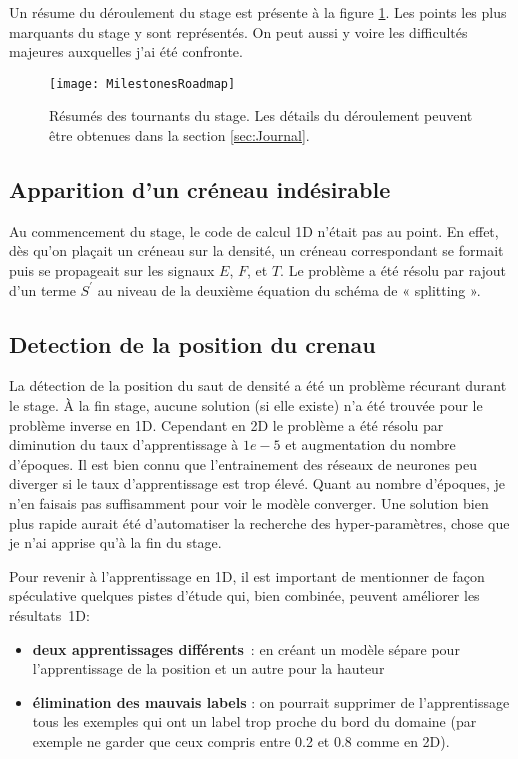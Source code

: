 Un résume du déroulement du stage est présente à la figure \ref{fig:MilestonesRoadmap}. Les points les plus marquants du stage y sont représentés. On peut aussi y voire les difficultés majeures auxquelles j'ai été confronte.

\begin{figure}[H] 
\centering
\texttt{[image: MilestonesRoadmap]} 
\decoRule
\caption[MilestonesRoadmap]{Résumés des tournants du stage. Les détails du déroulement peuvent être obtenues dans la section \ref{sec:Journal}.}
\label{fig:MilestonesRoadmap}
\end{figure}

\subsection{Apparition d'un créneau indésirable}
Au commencement du stage, le code de calcul 1D n'était pas au point. En effet, dès qu'on plaçait un créneau sur la densité, un créneau correspondant se formait puis se propageait sur les signaux $E$, $F$, et $T$. Le problème a été résolu par rajout d'un terme $S^\prime$ au niveau de la deuxième équation du schéma de « splitting ».

\subsection{Detection de la position du crenau}
La détection de la position du saut de densité a été un problème récurant durant le stage. À la fin stage, aucune solution (si elle existe) n'a été trouvée pour le problème inverse en 1D. Cependant en 2D le problème a été résolu par diminution du taux d'apprentissage à $1e-5$ et augmentation du nombre d'époques. Il est bien connu que l'entrainement des réseaux de neurones peu diverger si le taux d'apprentissage est trop élevé. Quant au nombre d'époques, je n'en faisais pas suffisamment pour voir le modèle converger. Une solution bien plus rapide aurait été d'automatiser la recherche des hyper-paramètres, chose que je n'ai apprise qu'à la fin du stage.

Pour revenir à l'apprentissage en 1D, il est important de mentionner de façon spéculative quelques pistes d'étude qui, bien combinée, peuvent améliorer les résultats 1D:
\begin{itemize}
    \item \textbf{deux apprentissages différents} : en créant un modèle sépare pour l'apprentissage de la position et un autre pour la hauteur
    \item \textbf{élimination des mauvais labels} : on pourrait supprimer de l'apprentissage tous les exemples qui ont un label trop proche du bord du domaine (par exemple ne garder que ceux compris entre 0.2 et 0.8 comme en 2D).
\end{itemize}

